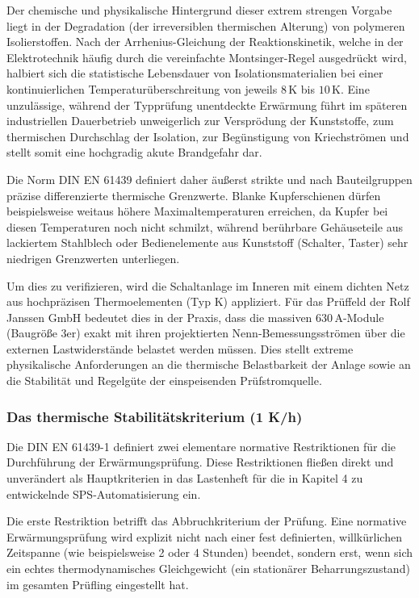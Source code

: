 Der chemische und physikalische Hintergrund dieser extrem strengen Vorgabe liegt in der Degradation (der irreversiblen thermischen Alterung) von polymeren Isolierstoffen. Nach der Arrhenius-Gleichung der Reaktionskinetik, welche in der Elektrotechnik häufig durch die vereinfachte Montsinger-Regel ausgedrückt wird, halbiert sich die statistische Lebensdauer von Isolationsmaterialien bei einer kontinuierlichen Temperaturüberschreitung von jeweils $8\,\text{K}$ bis $10\,\text{K}$. Eine unzulässige, während der Typprüfung unentdeckte Erwärmung führt im späteren industriellen Dauerbetrieb unweigerlich zur Versprödung der Kunststoffe, zum thermischen Durchschlag der Isolation, zur Begünstigung von Kriechströmen und stellt somit eine hochgradig akute Brandgefahr dar.

Die Norm DIN EN 61439 definiert daher äußerst strikte und nach Bauteilgruppen präzise differenzierte thermische Grenzwerte. Blanke Kupferschienen dürfen beispielsweise weitaus höhere Maximaltemperaturen erreichen, da Kupfer bei diesen Temperaturen noch nicht schmilzt, während berührbare Gehäuseteile aus lackiertem Stahlblech oder Bedienelemente aus Kunststoff (Schalter, Taster) sehr niedrigen Grenzwerten unterliegen. 

Um dies zu verifizieren, wird die Schaltanlage im Inneren mit einem dichten Netz aus hochpräzisen Thermoelementen (Typ K) appliziert. Für das Prüffeld der Rolf Janssen GmbH bedeutet dies in der Praxis, dass die massiven $630\,\text{A}$-Module (Baugröße 3er) exakt mit ihren projektierten Nenn-Bemessungsströmen über die externen Lastwiderstände belastet werden müssen. Dies stellt extreme physikalische Anforderungen an die thermische Belastbarkeit der Anlage sowie an die Stabilität und Regelgüte der einspeisenden Prüfstromquelle.
\subsubsection{Das thermische Stabilitätskriterium (1 K/h)}
Die DIN EN 61439-1 definiert zwei elementare normative Restriktionen für die Durchführung der Erwärmungsprüfung. Diese Restriktionen fließen direkt und unverändert als Hauptkriterien in das Lastenheft für die in Kapitel 4 zu entwickelnde SPS-Automatisierung ein.

Die erste Restriktion betrifft das Abbruchkriterium der Prüfung. Eine normative Erwärmungsprüfung wird explizit nicht nach einer fest definierten, willkürlichen Zeitspanne (wie beispielsweise 2 oder 4 Stunden) beendet, sondern erst, wenn sich ein echtes thermodynamisches Gleichgewicht (ein stationärer Beharrungszustand) im gesamten Prüfling eingestellt hat.

